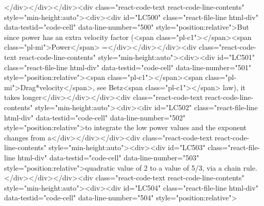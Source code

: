 {{{</div></div></div><div class="react-code-text react-code-line-contents" style="min-height:auto"><div><div id="LC500" class="react-file-line html-div" data-testid="code-cell" data-line-number="500" style="position:relative">But since power has an extra velocity factor (<span class="pl-c1">\emph</span>{<span class="pl-mi">Power</span>} =</div></div></div><div class="react-code-text react-code-line-contents" style="min-height:auto"><div><div id="LC501" class="react-file-line html-div" data-testid="code-cell" data-line-number="501" style="position:relative"><span class="pl-c1">\emph</span>{<span class="pl-mi">Drag*velocity</span>}, see Betz<span class="pl-c1">\textquotesingle</span>{} law), it takes longer</div></div></div><div class="react-code-text react-code-line-contents" style="min-height:auto"><div><div id="LC502" class="react-file-line html-div" data-testid="code-cell" data-line-number="502" style="position:relative">to integrate the low power values and the exponent changes from a</div></div></div><div class="react-code-text react-code-line-contents" style="min-height:auto"><div><div id="LC503" class="react-file-line html-div" data-testid="code-cell" data-line-number="503" style="position:relative">quadratic value of 2 to a value of 5/3, via a chain rule.</div></div></div><div class="react-code-text react-code-line-contents" style="min-height:auto"><div><div id="LC504" class="react-file-line html-div" data-testid="code-cell" data-line-number="504" style="position:relative">
}}}
